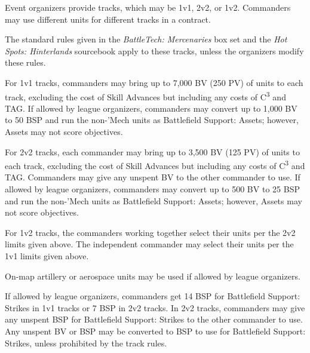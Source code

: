 Event organizers provide tracks, which may be 1v1, 2v2, or 1v2.
Commanders may use different units for different tracks in a contract.

The standard rules given in the \emph{BattleTech: Mercenaries} box set and the \emph{Hot Spots: Hinterlands} sourcebook apply to these tracks, unless the organizers modify these rules.

For 1v1 tracks, commanders may bring up to 7,000 BV (250 PV) of units to each track, excluding the cost of Skill Advances but including any costs of C\textsuperscript{3} and TAG.
If allowed by league organizers, commanders may convert up to 1,000 BV to 50 BSP and run the non-'Mech units as Battlefield Support: Assets; however, Assets may not score objectives.

For 2v2 tracks, each commander may bring up to 3,500 BV (125 PV) of units to each track, excluding the cost of Skill Advances but including any costs of C\textsuperscript{3} and TAG.
Commanders may give any unspent BV to the other commander to use.
If allowed by league organizers, commanders may convert up to 500 BV to 25 BSP and run the non-'Mech units as Battlefield Support: Assets; however, Assets may not score objectives.

For 1v2 tracks, the commanders working together select their units per the 2v2 limits given above.
The independent commander may select their units per the 1v1 limits given above.

On-map artillery or aerospace units may be used if allowed by league organizers.

If allowed by league organizers, commanders get 14 BSP for Battlefield Support: Strikes in 1v1 tracks or 7 BSP in 2v2 tracks.
In 2v2 tracks, commanders may give any unspent BSP for Battlefield Support: Strikes to the other commander to use.
Any unspent BV or BSP may be converted to BSP to use for Battlefield Support: Strikes, unless prohibited by the track rules.
